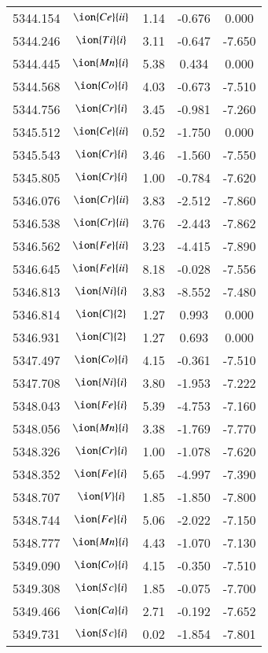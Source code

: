 \documentclass[fleqn,usenatbib]{mnras}
\begin{document}
\begin{center}
\begin{table}
\begin{tabular}{ccccc}
5344.154 &  $\ion{Ce}{ii}$  & 1.14 & -0.676 & 0.000 \\ 
5344.246 &  $\ion{Ti}{i}$  & 3.11 & -0.647 & -7.650 \\ 
5344.445 &  $\ion{Mn}{i}$  & 5.38 & 0.434 & 0.000 \\ 
5344.568 &  $\ion{Co}{i}$  & 4.03 & -0.673 & -7.510 \\ 
5344.756 &  $\ion{Cr}{i}$  & 3.45 & -0.981 & -7.260 \\ 
5345.512 &  $\ion{Ce}{ii}$  & 0.52 & -1.750 & 0.000 \\ 
5345.543 &  $\ion{Cr}{i}$  & 3.46 & -1.560 & -7.550 \\ 
5345.805 &  $\ion{Cr}{i}$  & 1.00 & -0.784 & -7.620 \\ 
5346.076 &  $\ion{Cr}{ii}$  & 3.83 & -2.512 & -7.860 \\ 
5346.538 &  $\ion{Cr}{ii}$  & 3.76 & -2.443 & -7.862 \\ 
5346.562 &  $\ion{Fe}{ii}$  & 3.23 & -4.415 & -7.890 \\ 
5346.645 &  $\ion{Fe}{ii}$  & 8.18 & -0.028 & -7.556 \\ 
5346.813 &  $\ion{Ni}{i}$  & 3.83 & -8.552 & -7.480 \\ 
5346.814 &  $\ion{C}{2}$ & 1.27 & 0.993 & 0.000 \\ 
5346.931 &  $\ion{C}{2}$ & 1.27 & 0.693 & 0.000 \\ 
5347.497 &  $\ion{Co}{i}$  & 4.15 & -0.361 & -7.510 \\ 
5347.708 &  $\ion{Ni}{i}$  & 3.80 & -1.953 & -7.222 \\ 
5348.043 &  $\ion{Fe}{i}$  & 5.39 & -4.753 & -7.160 \\ 
5348.056 &  $\ion{Mn}{i}$  & 3.38 & -1.769 & -7.770 \\ 
5348.326 &  $\ion{Cr}{i}$  & 1.00 & -1.078 & -7.620 \\ 
5348.352 &  $\ion{Fe}{i}$  & 5.65 & -4.997 & -7.390 \\ 
5348.707 &  $\ion{V}{i}$  & 1.85 & -1.850 & -7.800 \\ 
5348.744 &  $\ion{Fe}{i}$  & 5.06 & -2.022 & -7.150 \\ 
5348.777 &  $\ion{Mn}{i}$  & 4.43 & -1.070 & -7.130 \\ 
5349.090 &  $\ion{Co}{i}$  & 4.15 & -0.350 & -7.510 \\ 
5349.308 &  $\ion{Sc}{i}$  & 1.85 & -0.075 & -7.700 \\ 
5349.466 &  $\ion{Ca}{i}$  & 2.71 & -0.192 & -7.652 \\ 
5349.731 &  $\ion{Sc}{i}$  & 0.02 & -1.854 & -7.801 \\ 

\end{tabular}
\end{table}
\end{center}
\end{document}
